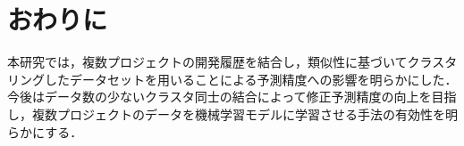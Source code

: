 \documentclass[T,J]{fose} %
\begin{document}
\vspace{-4mm}
\section{おわりに}\label{sec:end}
本研究では，複数プロジェクトの開発履歴を結合し，類似性に基づいてクラスタリングしたデータセットを用いることによる予測精度への影響を明らかにした．今後はデータ数の少ないクラスタ同士の結合によって修正予測精度の向上を目指し，複数プロジェクトのデータを機械学習モデルに学習させる手法の有効性を明らかにする．




\vspace{-4mm}



\end{document}
